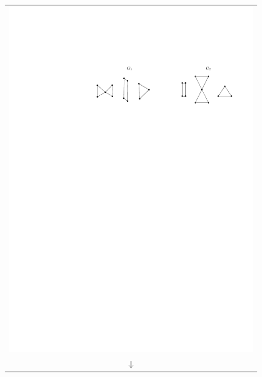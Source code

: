 \documentclass[11pt]{patmorin}
\begin{document}
\begin{figure}
  \begin{center}
   \begin{tabular}{c}
     \includegraphics{img/example-1} \\[2ex]
     $\Downarrow$ \\

\end{tabular}
\end{center}
\end{figure}
\end{document}
